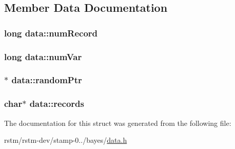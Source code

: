 \subsection{Member Data Documentation}
\hypertarget{structdata_a86f02f547af117233c320481fa6af765}{
\subsubsection[{num\-Record}]{\setlength{\rightskip}{0pt plus 5cm}long data\-::num\-Record}}\label{structdata_a86f02f547af117233c320481fa6af765}
\hypertarget{structdata_a57c490bd4c1c55b80471b188b63eb050}{
\subsubsection[{num\-Var}]{\setlength{\rightskip}{0pt plus 5cm}long data\-::num\-Var}}\label{structdata_a57c490bd4c1c55b80471b188b63eb050}
\hypertarget{structdata_a39ede05c57971b7737f6e7fc700c5493}{
\subsubsection[{random\-Ptr}]{$\ast$ data\-::random\-Ptr}}\label{structdata_a39ede05c57971b7737f6e7fc700c5493}
\hypertarget{structdata_ae9db45965c9bae02b2320fadefc800c6}{
\subsubsection[{records}]{\setlength{\rightskip}{0pt plus 5cm}char$\ast$ data\-::records}}\label{structdata_ae9db45965c9bae02b2320fadefc800c6}


The documentation for this struct was generated from the following file\-:\begin{DoxyCompactItemize}
\item 
rstm/rstm-\/dev/stamp-\/0../bayes/\hyperlink{data_8h}{data.\-h}\end{DoxyCompactItemize}
